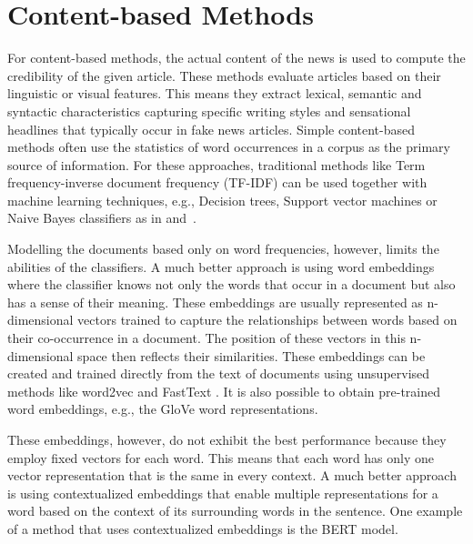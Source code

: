 \section{Content-based Methods}
For content-based methods, the actual content of the news is used to compute the credibility of the given article. These methods evaluate articles based on their linguistic or visual features. This means they extract lexical, semantic and syntactic characteristics capturing specific writing styles and sensational headlines that typically occur in fake news articles. 
Simple content-based methods often use the statistics of word occurrences in a corpus as the primary source of information. For these approaches, traditional methods like Term frequency-inverse document frequency (TF-IDF)\cite{tf-idf} can be used together with machine learning techniques, e.g., Decision trees, Support vector machines or Naive Bayes classifiers as in \cite{prev-work-dt} and~\cite{prev-work-bayes}.

Modelling the documents based only on word frequencies, however, limits the abilities of the classifiers. A much better approach is using word embeddings where the classifier knows not only the words that occur in a document but also has a sense of their meaning. These embeddings are usually represented as n-dimensional vectors trained to capture the relationships between words based on their co-occurrence in a document. The position of these vectors in this n-dimensional space then reflects their similarities. These embeddings can be created and trained directly from the text of documents using unsupervised methods like word2vec \cite{word2vec} and FastText \cite{fasttext}. It is also possible to obtain pre-trained word embeddings, e.g., the GloVe \cite{prev-work-glove} word representations.

These embeddings, however, do not exhibit the best performance because they employ fixed vectors for each word. This means that each word has only one vector representation that is the same in every context. A much better approach is using contextualized embeddings that enable multiple representations for a word based on the context of its surrounding words in the sentence. One example of a method that uses contextualized embeddings is the BERT \cite{bert} model.

